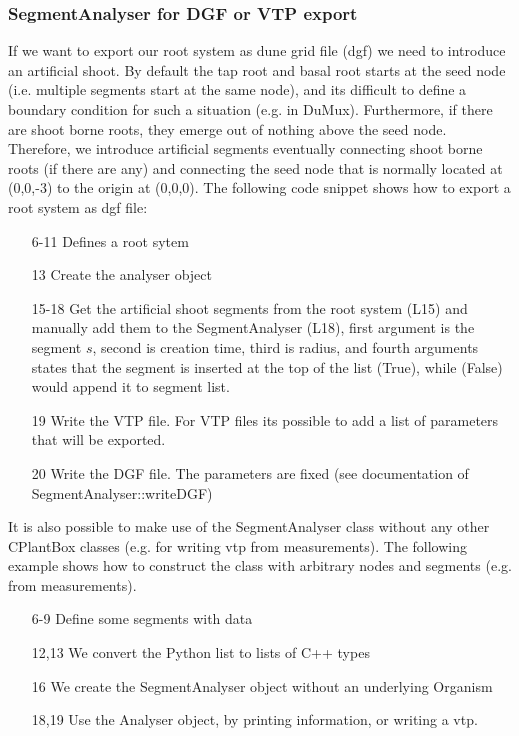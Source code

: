 \subsubsection*{SegmentAnalyser for DGF or VTP export}

If we want to export our root system as dune grid file (dgf) we need to introduce an artificial shoot. By default the tap root and basal root starts at the seed node (i.e. multiple segments start at the same node), and its difficult to define a boundary condition for such a situation (e.g. in DuMux). Furthermore, if there are shoot borne roots, they emerge out of nothing above the seed node. Therefore, we introduce artificial segments eventually connecting shoot borne roots (if there are any) and connecting the seed node that is normally located at (0,0,-3) to the origin at (0,0,0). The following code snippet shows how to export a root system as dgf file:



\begin{itemize}
 \item[6-11] Defines a root sytem
 \item[13] Create the analyser object
 \item[15-18] Get the artificial shoot segments from the root system (L15) and manually add them to the SegmentAnalyser (L18), first argument is the segment $s$, second is creation time, third is radius, and fourth arguments states that the segment is inserted at the top of the list (True), while (False) would append it to segment list.
 \item[19] Write the VTP file. For VTP files its possible to add a list of parameters that will be exported. 
 \item[20] Write the DGF file. The parameters are fixed (see documentation of SegmentAnalyser::writeDGF)
\end{itemize}

It is also possible to make use of the SegmentAnalyser class without any other CPlantBox classes (e.g. for writing vtp from measurements). The following example shows how to construct the class with arbitrary nodes and segments (e.g. from measurements). 



\begin{itemize}
 \item[6-9] Define some segments with data
 \item[12,13] We convert the Python list to lists of C++ types
 \item[16] We create the SegmentAnalyser object without an underlying Organism
 \item[18,19] Use the Analyser object, by printing information, or writing a vtp. 
\end{itemize}
